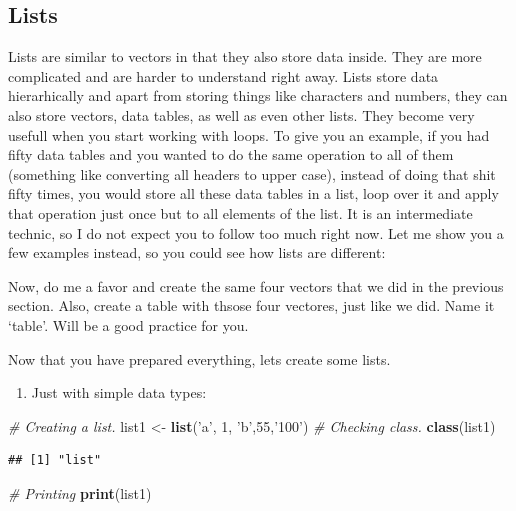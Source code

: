 \documentclass[]{book}
\newenvironment{Shaded}{\begin{snugshade}}{\end{snugshade}}
\newcommand{\CommentTok}[1]{\textcolor[rgb]{0.56,0.35,0.01}{\textit{#1}}}
\newcommand{\DecValTok}[1]{\textcolor[rgb]{0.00,0.00,0.81}{#1}}
\newcommand{\KeywordTok}[1]{\textcolor[rgb]{0.13,0.29,0.53}{\textbf{#1}}}
\newcommand{\NormalTok}[1]{#1}
\newcommand{\StringTok}[1]{\textcolor[rgb]{0.31,0.60,0.02}{#1}}
\providecommand{\tightlist}{%
  \setlength{\itemsep}{0pt}\setlength{\parskip}{0pt}}
\begin{document}
\hypertarget{lists}{%
\subsection{Lists}\label{lists}}

Lists are similar to vectors in that they also store data inside. They are more complicated and are harder to understand right away. Lists store data hierarhically and apart from storing things like characters and numbers, they can also store vectors, data tables, as well as even other lists. They become very usefull when you start working with loops. To give you an example, if you had fifty data tables and you wanted to do the same operation to all of them (something like converting all headers to upper case), instead of doing that shit fifty times, you would store all these data tables in a list, loop over it and apply that operation just once but to all elements of the list. It is an intermediate technic, so I do not expect you to follow too much right now. Let me show you a few examples instead, so you could see how lists are different:

Now, do me a favor and create the same four vectors that we did in the previous section. Also, create a table with thsose four vectores, just like we did. Name it `table'. Will be a good practice for you.

Now that you have prepared everything, lets create some lists.

\begin{enumerate}
\def\labelenumi{\arabic{enumi}.}
\tightlist
\item
  Just with simple data types:
\end{enumerate}

\begin{Shaded}
\begin{Highlighting}[]
\CommentTok{# Creating a list.}
\NormalTok{list1 <-}\StringTok{ }\KeywordTok{list}\NormalTok{(}\StringTok{'a'}\NormalTok{, }\DecValTok{1}\NormalTok{, }\StringTok{'b'}\NormalTok{,}\DecValTok{55}\NormalTok{,}\StringTok{'100'}\NormalTok{)}
\CommentTok{# Checking class.}
\KeywordTok{class}\NormalTok{(list1)}
\end{Highlighting}
\end{Shaded}

\begin{verbatim}
## [1] "list"
\end{verbatim}

\begin{Shaded}
\begin{Highlighting}[]
\CommentTok{# Printing}
\KeywordTok{print}\NormalTok{(list1)}
\end{Highlighting}
\end{Shaded}
\end{document}
